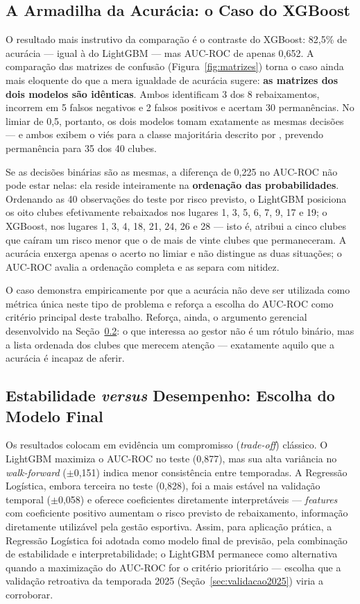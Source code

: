 \documentclass[
    article,
    12pt,
    oneside,
    a4paper,
    english,
    brazilian
    ]{abntex2}
\begin{document}
\subsection{A Armadilha da Acurácia: o Caso do XGBoost}
\label{sec:armadilha}

O resultado mais instrutivo da comparação é o contraste do XGBoost: 82,5\% de acurácia --- igual à do LightGBM --- mas AUC-ROC de apenas 0,652. A comparação das matrizes de confusão (Figura~\ref{fig:matrizes}) torna o caso ainda mais eloquente do que a mera igualdade de acurácia sugere: \textbf{as matrizes dos dois modelos são idênticas}. Ambos identificam 3 dos 8 rebaixamentos, incorrem em 5 falsos negativos e 2 falsos positivos e acertam 30 permanências. No limiar de 0,5, portanto, os dois modelos tomam exatamente as mesmas decisões --- e ambos exibem o viés para a classe majoritária descrito por , prevendo permanência para 35 dos 40 clubes.

Se as decisões binárias são as mesmas, a diferença de 0,225 no AUC-ROC não pode estar nelas: ela reside inteiramente na \textbf{ordenação das probabilidades}. Ordenando as 40 observações do teste por risco previsto, o LightGBM posiciona os oito clubes efetivamente rebaixados nos lugares 1, 3, 5, 6, 7, 9, 17 e 19; o XGBoost, nos lugares 1, 3, 4, 18, 21, 24, 26 e 28 --- isto é, atribui a cinco clubes que caíram um risco menor que o de mais de vinte clubes que permaneceram. A acurácia enxerga apenas o acerto no limiar e não distingue as duas situações; o AUC-ROC avalia a ordenação completa e as separa com nitidez.

O caso demonstra empiricamente por que a acurácia não deve ser utilizada como métrica única neste tipo de problema e reforça a escolha do AUC-ROC como critério principal deste trabalho. Reforça, ainda, o argumento gerencial desenvolvido na Seção~\ref{sec:tradeoff}: o que interessa ao gestor não é um rótulo binário, mas a lista ordenada dos clubes que merecem atenção --- exatamente aquilo que a acurácia é incapaz de aferir.

\subsection{Estabilidade \textit{versus} Desempenho: Escolha do Modelo Final}
\label{sec:tradeoff}

Os resultados colocam em evidência um compromisso (\textit{trade-off}) clássico. O LightGBM maximiza o AUC-ROC no teste (0,877), mas sua alta variância no \textit{walk-forward} ($\pm$0,151) indica menor consistência entre temporadas. A Regressão Logística, embora terceira no teste (0,828), foi a mais estável na validação temporal ($\pm$0,058) e oferece coeficientes diretamente interpretáveis --- \textit{features} com coeficiente positivo aumentam o risco previsto de rebaixamento, informação diretamente utilizável pela gestão esportiva. Assim, para aplicação prática, a Regressão Logística foi adotada como modelo final de previsão, pela combinação de estabilidade e interpretabilidade; o LightGBM permanece como alternativa quando a maximização do AUC-ROC for o critério prioritário --- escolha que a validação retroativa da temporada 2025 (Seção~\ref{sec:validacao2025}) viria a corroborar.
\end{document}
